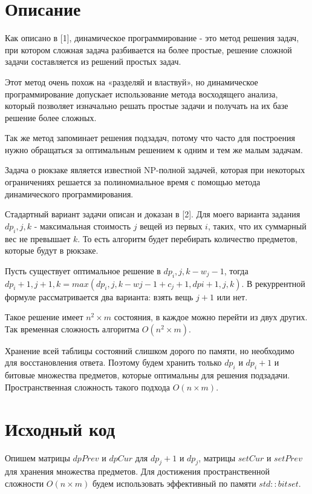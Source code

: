 \section{Описание}
Как описано в [1], динамическое программирование - это метод решения задач, при
котором сложная задача разбивается на более простые, решение сложной задачи
составляется из решений простых задач.

Этот метод очень похож на «разделяй и властвуй», но динамическое программирование допускает использование метода восходящего анализа, который позволяет
изначально решать простые задачи и получать на их базе решение более сложных.

Так же метод запоминает решения подзадач, потому что часто для построения нужно
обращаться за оптимальным решением к одним и тем же малым задачам.

Задача о рюкзаке является известной NP-полной задачей, которая при некоторых
ограничениях решается за полиномиальное время с помощью метода динамического
программирования.

Стадартный вариант задачи описан и доказан в [2]. Для моего варианта задания
$dp_i,j,k$ - максимальная стоимость $j$ вещей из первых $i$, таких, что их суммарный вес
не превышает $k$. То есть алгоритм будет перебирать количество предметов, которые будут в рюкзаке.

Пусть существует оптимальное решение в $dp_i,j,k-w_j-1$, тогда $dp_i+1,j+1,k = max(dp_i,j,k-wj-1 + c_j+1, dpi + 1, j, k)$. В рекуррентной формуле рассматривается два варианта: взять вещь $j + 1$ или нет.

Такое решение имеет $n^2 \times m$ состояния, в каждое можно перейти из двух других. Так временная сложность алгоритма $O(n^2 \times m)$.

Хранение всей таблицы состояний слишком дорого по памяти, но необходимо для восстановления ответа. 
Поэтому будем хранить только $dp_i$ и $dp_i+1$ и битовые множества предметов, которые оптимальны для решения подзадачи.
Пространственная сложность такого подхода $O(n \times m)$.
\pagebreak

\section{Исходный код}
Опишем матрицы $dpPrev$ и $dpCur$ для $dp_j+1$ и $dp_j$, матрицы $setCur$ и $setPrev$ для хранения множества предметов.
Для достижения пространственной сложности $O(n \times m)$ будем использовать эффективный по памяти $std :: bitset$.

